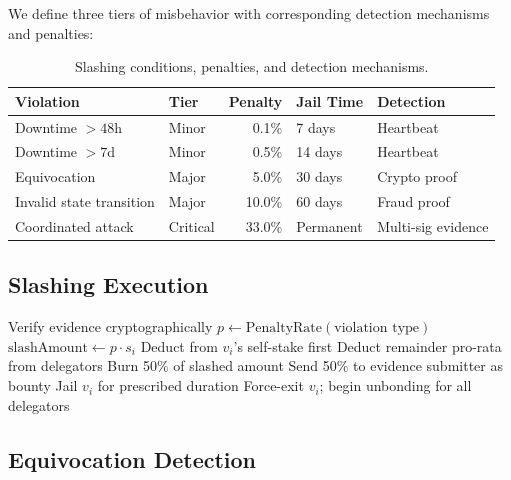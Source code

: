 \documentclass[11pt,a4paper]{article}
\begin{document}
We define three tiers of misbehavior with corresponding detection mechanisms and penalties:

\begin{table}[H]
\centering
\caption{Slashing conditions, penalties, and detection mechanisms.}
\label{tab:slashing}
\begin{tabular}{p{3cm}lrll}
\toprule
\textbf{Violation} & \textbf{Tier} & \textbf{Penalty} & \textbf{Jail Time} & \textbf{Detection} \\
\midrule
Downtime $> 48$h & Minor & 0.1\% & 7 days & Heartbeat \\
Downtime $> 7$d & Minor & 0.5\% & 14 days & Heartbeat \\
Equivocation & Major & 5.0\% & 30 days & Crypto proof \\
Invalid state transition & Major & 10.0\% & 60 days & Fraud proof \\
Coordinated attack & Critical & 33.0\% & Permanent & Multi-sig evidence \\
\bottomrule
\end{tabular}
\end{table}

\subsection{Slashing Execution}

\begin{algorithm}[H]
\caption{Slashing Execution Protocol}
\label{alg:slashing}
\begin{algorithmic}[1]
    \State Verify evidence cryptographically
    \State $p \gets \text{PenaltyRate}(\text{violation type})$
    \State $\text{slashAmount} \gets p \cdot s_i$
    \State Deduct from $v_i$'s self-stake first
        \State Deduct remainder pro-rata from delegators
    \EndIf
    \State Burn 50\% of slashed amount
    \State Send 50\% to evidence submitter as bounty
    \State Jail $v_i$ for prescribed duration
        \State Force-exit $v_i$; begin unbonding for all delegators
    \EndIf
\EndProcedure
\end{algorithmic}
\end{algorithm}

\subsection{Equivocation Detection}
\end{document}
